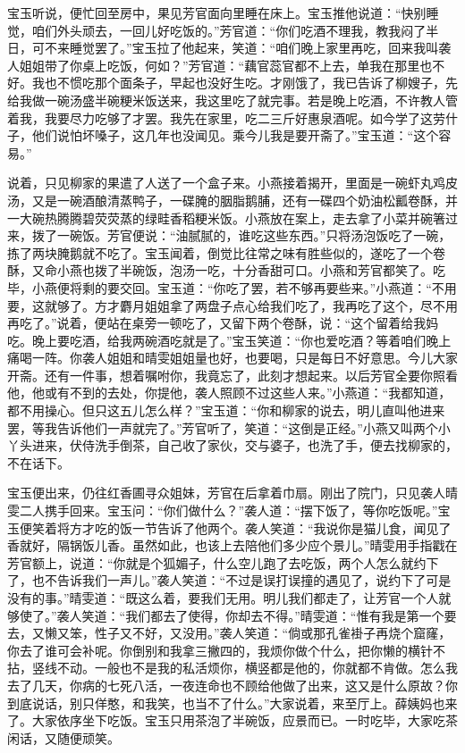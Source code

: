 宝玉听说，便忙回至房中，果见芳官面向里睡在床上。宝玉推他说道：``快别睡觉，咱们外头顽去，一回儿好吃饭的。''芳官道：``你们吃酒不理我，教我闷了半日，可不来睡觉罢了。''宝玉拉了他起来，笑道：``咱们晚上家里再吃，回来我叫袭人姐姐带了你桌上吃饭，何如？''芳官道：``藕官蕊官都不上去，单我在那里也不好。我也不惯吃那个面条子，早起也没好生吃。才刚饿了，我已告诉了柳嫂子，先给我做一碗汤盛半碗粳米饭送来，我这里吃了就完事。若是晚上吃酒，不许教人管着我，我要尽力吃够了才罢。我先在家里，吃二三斤好惠泉酒呢。如今学了这劳什子，他们说怕坏嗓子，这几年也没闻见。乘今儿我是要开斋了。''宝玉道：``这个容易。''

说着，只见柳家的果遣了人送了一个盒子来。小燕接着揭开，里面是一碗虾丸鸡皮汤，又是一碗酒酿清蒸鸭子，一碟腌的胭脂鹅脯，还有一碟四个奶油松瓤卷酥，并一大碗热腾腾碧荧荧蒸的绿畦香稻粳米饭。小燕放在案上，走去拿了小菜并碗箸过来，拨了一碗饭。芳官便说：``油腻腻的，谁吃这些东西。''只将汤泡饭吃了一碗，拣了两块腌鹅就不吃了。宝玉闻着，倒觉比往常之味有胜些似的，遂吃了一个卷酥，又命小燕也拨了半碗饭，泡汤一吃，十分香甜可口。小燕和芳官都笑了。吃毕，小燕便将剩的要交回。宝玉道：``你吃了罢，若不够再要些来。''小燕道：``不用要，这就够了。方才麝月姐姐拿了两盘子点心给我们吃了，我再吃了这个，尽不用再吃了。''说着，便站在桌旁一顿吃了，又留下两个卷酥，说：``这个留着给我妈吃。晚上要吃酒，给我两碗酒吃就是了。''宝玉笑道：``你也爱吃酒？等着咱们晚上痛喝一阵。你袭人姐姐和晴雯姐姐量也好，也要喝，只是每日不好意思。今儿大家开斋。还有一件事，想着嘱咐你，我竟忘了，此刻才想起来。以后芳官全要你照看他，他或有不到的去处，你提他，袭人照顾不过这些人来。''小燕道：``我都知道，都不用操心。但只这五儿怎么样？''宝玉道：``你和柳家的说去，明儿直叫他进来罢，等我告诉他们一声就完了。''芳官听了，笑道：``这倒是正经。''小燕又叫两个小丫头进来，伏侍洗手倒茶，自己收了家伙，交与婆子，也洗了手，便去找柳家的，不在话下。

宝玉便出来，仍往红香圃寻众姐妹，芳官在后拿着巾扇。刚出了院门，只见袭人晴雯二人携手回来。宝玉问：``你们做什么？''袭人道：``摆下饭了，等你吃饭呢。''宝玉便笑着将方才吃的饭一节告诉了他两个。袭人笑道：``我说你是猫儿食，闻见了香就好，隔锅饭儿香。虽然如此，也该上去陪他们多少应个景儿。''晴雯用手指戳在芳官额上，说道：``你就是个狐媚子，什么空儿跑了去吃饭，两个人怎么就约下了，也不告诉我们一声儿。''袭人笑道：``不过是误打误撞的遇见了，说约下了可是没有的事。''晴雯道：``既这么着，要我们无用。明儿我们都走了，让芳官一个人就够使了。''袭人笑道：``我们都去了使得，你却去不得。''晴雯道：``惟有我是第一个要去，又懒又笨，性子又不好，又没用。''袭人笑道：``倘或那孔雀褂子再烧个窟窿，你去了谁可会补呢。你倒别和我拿三撇四的，我烦你做个什么，把你懒的横针不拈，竖线不动。一般也不是我的私活烦你，横竖都是他的，你就都不肯做。怎么我去了几天，你病的七死八活，一夜连命也不顾给他做了出来，这又是什么原故？你到底说话，别只佯憨，和我笑，也当不了什么。''大家说着，来至厅上。薛姨妈也来了。大家依序坐下吃饭。宝玉只用茶泡了半碗饭，应景而已。一时吃毕，大家吃茶闲话，又随便顽笑。

